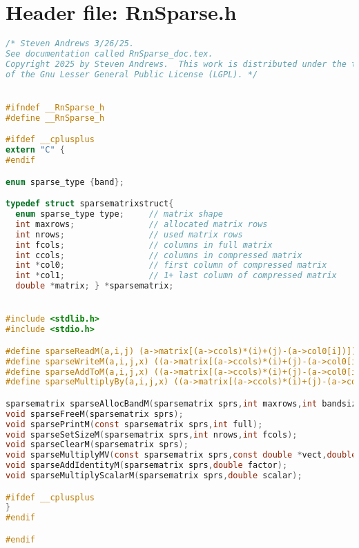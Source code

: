 \documentclass[11pt]{article}
\begin{document}
\maketitle

\section{Header file: RnSparse.h}

\begin{lstlisting}[language=C]
/* Steven Andrews 3/26/25.
See documentation called RnSparse_doc.tex.
Copyright 2025 by Steven Andrews.  This work is distributed under the terms
of the Gnu Lesser General Public License (LGPL). */


#ifndef __RnSparse_h
#define __RnSparse_h

#ifdef __cplusplus
extern "C" {
#endif

enum sparse_type {band};

typedef struct sparsematrixstruct{
  enum sparse_type type;     // matrix shape
  int maxrows;               // allocated matrix rows
  int nrows;                 // used matrix rows
  int fcols;                 // columns in full matrix
  int ccols;                 // columns in compressed matrix
  int *col0;                 // first column of compressed matrix
  int *col1;                 // 1+ last column of compressed matrix
  double *matrix; } *sparsematrix;


#include <stdlib.h>
#include <stdio.h>

#define sparseReadM(a,i,j) (a->matrix[(a->ccols)*(i)+(j)-(a->col0[i])])
#define sparseWriteM(a,i,j,x) ((a->matrix[(a->ccols)*(i)+(j)-(a->col0[i])])=(x))
#define sparseAddToM(a,i,j,x) ((a->matrix[(a->ccols)*(i)+(j)-(a->col0[i])])+=(x))
#define sparseMultiplyBy(a,i,j,x) ((a->matrix[(a->ccols)*(i)+(j)-(a->col0[i])])*=(x))

sparsematrix sparseAllocBandM(sparsematrix sprs,int maxrows,int bandsize);
void sparseFreeM(sparsematrix sprs);
void sparsePrintM(const sparsematrix sprs,int full);
void sparseSetSizeM(sparsematrix sprs,int nrows,int fcols);
void sparseClearM(sparsematrix sprs);
void sparseMultiplyMV(const sparsematrix sprs,const double *vect,double *ans);
void sparseAddIdentityM(sparsematrix sprs,double factor);
void sparseMultiplyScalarM(sparsematrix sprs,double scalar);

#ifdef __cplusplus
}
#endif

#endif
\end{lstlisting}
\end{document}
